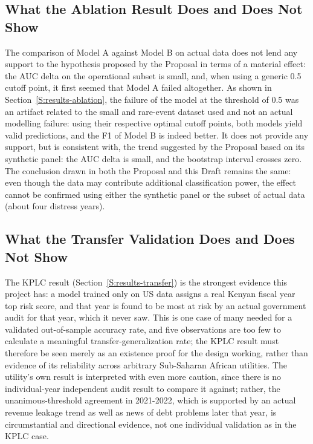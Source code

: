 \documentclass[final,1p,times]{elsarticle}
\begin{document}
\subsection{What the Ablation Result Does and Does Not Show}

The comparison of Model A against Model B on actual data does not lend any support to the hypothesis proposed by the Proposal in terms of a material effect: the AUC delta on the operational subset is small, and, when using a generic 0.5 cutoff point, it first seemed that Model A failed altogether. As shown in Section~\ref{S:results-ablation}, the failure of the model at the threshold of 0.5 was an artifact related to the small and rare-event dataset used and not an actual modelling failure: using their respective optimal cutoff points, both models yield valid predictions, and the F1 of Model B is indeed better. It does not provide any support, but is consistent with, the trend suggested by the Proposal based on its synthetic panel: the AUC delta is small, and the bootstrap interval crosses zero. The conclusion drawn in both the Proposal and this Draft remains the same: even though the data may contribute additional classification power, the effect cannot be confirmed using either the synthetic panel or the subset of actual data (about four distress years).

\subsection{What the Transfer Validation Does and Does Not Show}

The KPLC result (Section~\ref{S:results-transfer}) is the strongest evidence this project has: a model trained only on US data assigns a real Kenyan fiscal year top risk score, and that year is found to be most at risk by an actual government audit for that year, which it never saw. This is one case of many needed for a validated out-of-sample accuracy rate, and five observations are too few to calculate a meaningful transfer-generalization rate; the KPLC result must therefore be seen merely as an existence proof for the design working, rather than evidence of its reliability across arbitrary Sub-Saharan African utilities. The utility's own result is interpreted with even more caution, since there is no individual-year independent audit result to compare it against; rather, the unanimous-threshold agreement in 2021-2022, which is supported by an actual revenue leakage trend as well as news of debt problems later that year, is circumstantial and directional evidence, not one individual validation as in the KPLC case.
\end{document}
